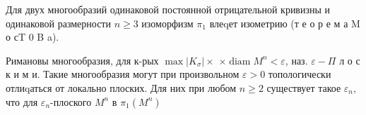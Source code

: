\documentclass[10pt]{article}
\begin{document}
Для двух многообразий одинаковой постоянной отрицательной кривизны и одинаковой размерности $n \geqslant 3$ изоморфизм $\pi_{1}$ влеqет изометрию (т е о р е м а $\mathrm{M}$ о сT 0 B a).



Римановы многообразия, для к-рых $\max \left|K_{\sigma}\right| \times$ $\times \operatorname{diam} M^{n}<\varepsilon$, наз. $\varepsilon-\Pi$ л о с к и м и. Такие многообразия могут при произвольном $\varepsilon>0$ топологически отлиqаться от локально плоских. Для них при любом $n \geqslant 2$ существует такое $\varepsilon_{n}$, что для $\varepsilon_{n}$-плоского $M^{n}$ в $\pi_{1}\left(M^{n}\right)$
\end{document}
